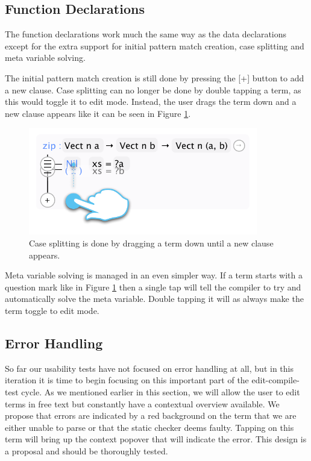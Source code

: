 \subsection{Function Declarations}
\label{subsec:new_design_function_dec}
The function declarations work much the same way as the data declarations
except for the extra support for initial pattern match creation, case splitting
and meta variable solving.

The initial pattern match creation is still done by pressing the [+] button to
add a new clause. Case splitting can no longer be done by double tapping a
term, as this would toggle it to edit mode. Instead, the user drags the term
down and a new clause appears like it can be seen in Figure
\ref{fig:case_splitting}.

\begin{figure}
	\centering
		\includegraphics[width=100mm]{diagrams/design_case_splitting.pdf}
	\caption{Case splitting is done by dragging a term down until a new clause
	appears.}
\label{fig:case_splitting}
\end{figure}

Meta variable solving is managed in an even simpler way. If a term starts with
a question mark like in Figure \ref{fig:case_splitting} then a single tap will
tell the compiler to try and automatically solve the meta variable. Double
tapping it will as always make the term toggle to edit mode.

\subsection{Error Handling}
So far our usability tests have not focused on error handling at all, but in
this iteration it is time to begin focusing on this important part of the
edit-compile-test cycle. As we mentioned earlier in this section, we will allow
the user to edit terms in free text but constantly have a contextual overview available.
We propose that errors are indicated by a red background on the term that we
are either unable to parse or that the static checker deems faulty. Tapping on
this term will bring up the context popover that will indicate the error.
This design is a proposal and should be thoroughly tested.


